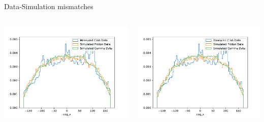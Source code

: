 \begin{frame}[t]{Data-Simulation mismatches}
\begin{columns}[onlytextwidth]
    \begin{column}{0.475\textwidth}
        \includegraphics[width=1.1\textwidth,page=16]{fig/gpd_mc_comp_cuts_nc.pdf}
    \end{column}
    \begin{column}{0.475\textwidth}
        \includegraphics[width=1.1\textwidth,page=8]{fig/gpd_mc_comp_cuts_nc.pdf}
    \end{column}
\end{columns}
\end{frame}


